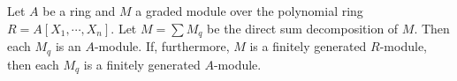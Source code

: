 Let $A$ be a ring and $M$ a graded module over the polynomial ring $R = A[X_1, \cdots, X_n]$. Let $M = \sum M_q$ be the direct sum decomposition of $M$. Then each $M_q$ is an $A$-module. If, furthermore, $M$ is a finitely generated $R$-module, then each $M_q$ is a finitely generated $A$-module.